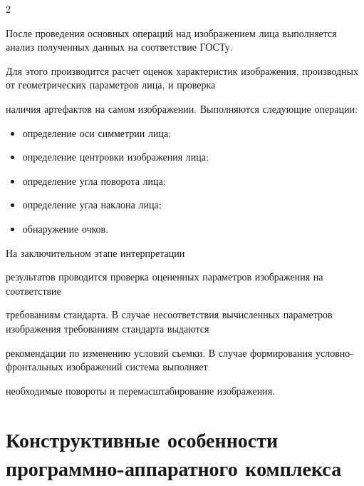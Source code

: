 \begin{multicols}{2}










\bigskip


\addtocounter{figure}{1}





После проведения основных операций над изоб\-ра\-же\-нием лица выполняется анализ полученных данных на соответствие ГОСТу. 


Для этого производится расчет оценок характеристик изображения, производных от геометрических параметров лица, и проверка 


наличия артефактов на самом изображении. Выполняются следующие операции:


\begin{itemize}


\item определение оси симметрии лица;


\item определение центровки изображения лица;


\item определение угла поворота лица;


\item определение угла наклона лица;


\item обнаружение очков.


\end{itemize}





На заключительном этапе интерпретации\linebreak


результатов проводится проверка оцененных параметров изображения на соответствие 


требованиям стандарта. В случае несоответствия вычисленных параметров изображения требованиям стандарта выдаются 


рекомендации по изменению условий съемки. В случае формирования условно-фрон\-таль\-ных изображений система выполняет 


необходимые повороты и перемасштабирование изображения.





\section{Конструктивные особенности программно-аппаратного комплекса}



\end{multicols}
